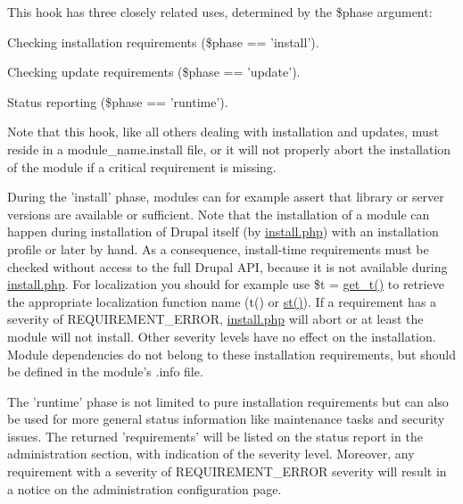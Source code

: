 This hook has three closely related uses, determined by the \$phase argument:
\begin{DoxyItemize}
\item Checking installation requirements (\$phase == 'install').
\item Checking update requirements (\$phase == 'update').
\item Status reporting (\$phase == 'runtime').
\end{DoxyItemize}

Note that this hook, like all others dealing with installation and updates, must reside in a module\_\-name.install file, or it will not properly abort the installation of the module if a critical requirement is missing.

During the 'install' phase, modules can for example assert that library or server versions are available or sufficient. Note that the installation of a module can happen during installation of Drupal itself (by \hyperlink{install_8php}{install.php}) with an installation profile or later by hand. As a consequence, install-\/time requirements must be checked without access to the full Drupal API, because it is not available during \hyperlink{install_8php}{install.php}. For localization you should for example use \$t = \hyperlink{group__sanitization_gaa50232f577883a48731fc93530628a79}{get\_\-t()} to retrieve the appropriate localization function name (t() or \hyperlink{group__sanitization_gabc78d1b88aa8081093abbbf71a516c7c}{st()}). If a requirement has a severity of REQUIREMENT\_\-ERROR, \hyperlink{install_8php}{install.php} will abort or at least the module will not install. Other severity levels have no effect on the installation. Module dependencies do not belong to these installation requirements, but should be defined in the module's .info file.

The 'runtime' phase is not limited to pure installation requirements but can also be used for more general status information like maintenance tasks and security issues. The returned 'requirements' will be listed on the status report in the administration section, with indication of the severity level. Moreover, any requirement with a severity of REQUIREMENT\_\-ERROR severity will result in a notice on the administration configuration page.


